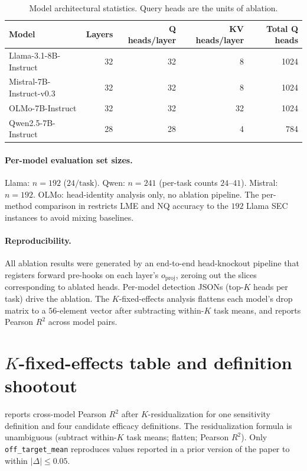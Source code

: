 \documentclass{article}
\theoremstyle{plain}
\theoremstyle{definition}
\theoremstyle{remark}
\begin{document}
\begin{table}[h]
\centering
\small
\begin{tabular}{lrrrr}
\toprule
\textbf{Model} & \textbf{Layers} & \textbf{Q heads/layer} & \textbf{KV heads/layer} & \textbf{Total Q heads} \\
\midrule
Llama-3.1-8B-Instruct      & 32 & 32 & 8  & 1024 \\
Mistral-7B-Instruct-v0.3   & 32 & 32 & 8  & 1024 \\
OLMo-7B-Instruct           & 32 & 32 & 32 & 1024 \\
Qwen2.5-7B-Instruct        & 28 & 28 & 4  & 784 \\
\bottomrule
\end{tabular}
\caption{Model architectural statistics. Query heads are the units of ablation.}
\end{table}

\paragraph{Per-model evaluation set sizes.} Llama: $n{=}192$ ($24/\text{task}$). Qwen: $n{=}241$ (per-task counts $24$--$41$). Mistral: $n{=}192$. OLMo: head-identity analysis only, no ablation pipeline. The per-method comparison in  restricts LME and NQ accuracy to the $192$ Llama SEC instances to avoid mixing baselines.

\paragraph{Reproducibility.} All ablation results were generated by an end-to-end head-knockout pipeline that registers forward pre-hooks on each layer's $o_{\text{proj}}$, zeroing out the slices corresponding to ablated heads. Per-model detection JSONs (top-$K$ heads per task) drive the ablation. The $K$-fixed-effects analysis flattens each model's drop matrix to a $56$-element vector after subtracting within-$K$ task means, and reports Pearson $R^2$ across model pairs.

\section{$K$-fixed-effects table and definition shootout}
\label{app:kfe}
\label{app:kfe-defs}

 reports cross-model Pearson $R^2$ after $K$-residualization for one sensitivity definition and four candidate efficacy definitions. The residualization formula is unambiguous (subtract within-$K$ task means; flatten; Pearson $R^2$). Only \texttt{off\_target\_mean} reproduces values reported in a prior version of the paper to within $|\Delta| \leq 0.05$.
\end{document}
